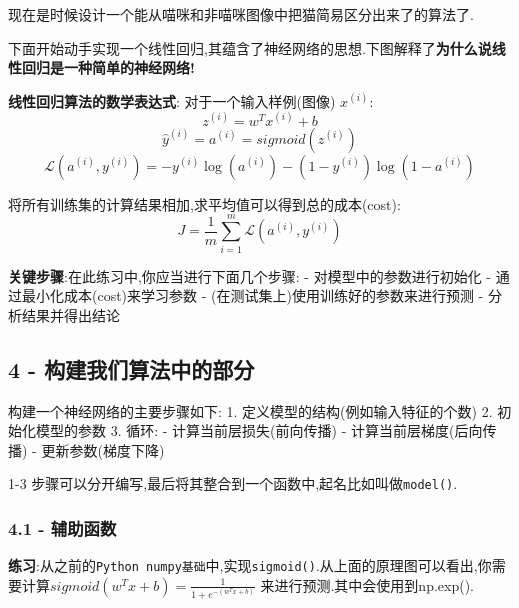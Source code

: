 \documentclass[11pt]{article}
\begin{document}
现在是时候设计一个能从喵咪和非喵咪图像中把猫简易区分出来了的算法了.

下面开始动手实现一个线性回归,其蕴含了神经网络的思想.下图解释了\textbf{为什么说线性回归是一种简单的神经网络!}

\textbf{线性回归算法的数学表达式}: 对于一个输入样例(图像) \(x^{(i)}\):
\[z^{(i)} = w^T x^{(i)} + b \tag{1}\]
\[\hat{y}^{(i)} = a^{(i)} = sigmoid(z^{(i)})\tag{2}\]
\[ \mathcal{L}(a^{(i)}, y^{(i)}) =  - y^{(i)}  \log(a^{(i)}) - (1-y^{(i)} )  \log(1-a^{(i)})\tag{3}\]

将所有训练集的计算结果相加,求平均值可以得到总的成本(cost):
\[ J = \frac{1}{m} \sum_{i=1}^m \mathcal{L}(a^{(i)}, y^{(i)})\tag{6}\]

\textbf{关键步骤}:在此练习中,你应当进行下面几个步骤: -
对模型中的参数进行初始化 - 通过最小化成本(cost)来学习参数 -
(在测试集上)使用训练好的参数来进行预测 - 分析结果并得出结论

    \subsection{4 -
构建我们算法中的部分}\label{ux6784ux5efaux6211ux4eecux7b97ux6cd5ux4e2dux7684ux90e8ux5206}

构建一个神经网络的主要步骤如下: 1. 定义模型的结构(例如输入特征的个数) 2.
初始化模型的参数 3. 循环: - 计算当前层损失(前向传播) -
计算当前层梯度(后向传播) - 更新参数(梯度下降)

1-3
步骤可以分开编写,最后将其整合到一个函数中,起名比如叫做\texttt{model()}.

\subsubsection{4.1 - 辅助函数}\label{ux8f85ux52a9ux51fdux6570}

\textbf{练习}:从之前的\texttt{Python\ numpy基础}中,实现\texttt{sigmoid()}.从上面的原理图可以看出,你需要计算\(sigmoid( w^T x + b) = \frac{1}{1 + e^{-(w^T x + b)}}\)
来进行预测.其中会使用到np.exp().
\end{document}
